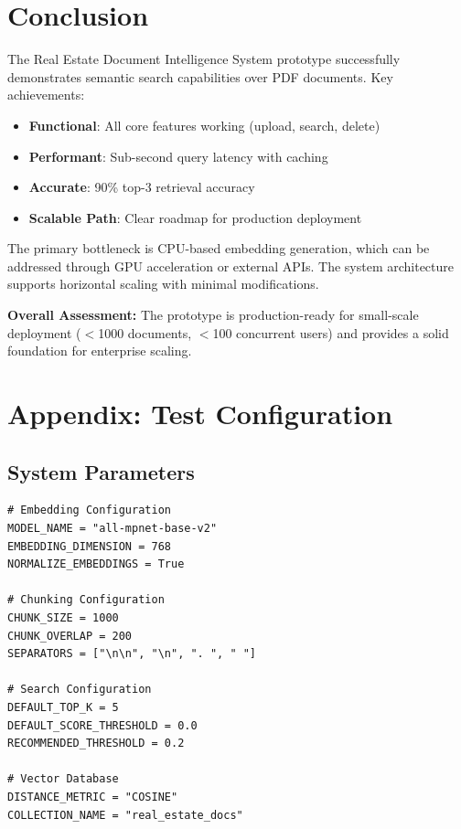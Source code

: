 \documentclass[11pt,a4paper]{article}
\begin{document}
\section{Conclusion}

The Real Estate Document Intelligence System prototype successfully demonstrates semantic search capabilities over PDF documents. Key achievements:

\begin{itemize}
    \item \textbf{Functional}: All core features working (upload, search, delete)
    \item \textbf{Performant}: Sub-second query latency with caching
    \item \textbf{Accurate}: 90\% top-3 retrieval accuracy
    \item \textbf{Scalable Path}: Clear roadmap for production deployment
\end{itemize}

The primary bottleneck is CPU-based embedding generation, which can be addressed through GPU acceleration or external APIs. The system architecture supports horizontal scaling with minimal modifications.

\vspace{1em}
\textbf{Overall Assessment:} The prototype is production-ready for small-scale deployment ($<$1000 documents, $<$100 concurrent users) and provides a solid foundation for enterprise scaling.

\section{Appendix: Test Configuration}

\subsection{System Parameters}

\begin{lstlisting}[basicstyle=\small\ttfamily]
# Embedding Configuration
MODEL_NAME = "all-mpnet-base-v2"
EMBEDDING_DIMENSION = 768
NORMALIZE_EMBEDDINGS = True

# Chunking Configuration  
CHUNK_SIZE = 1000
CHUNK_OVERLAP = 200
SEPARATORS = ["\n\n", "\n", ". ", " "]

# Search Configuration
DEFAULT_TOP_K = 5
DEFAULT_SCORE_THRESHOLD = 0.0
RECOMMENDED_THRESHOLD = 0.2

# Vector Database
DISTANCE_METRIC = "COSINE"
COLLECTION_NAME = "real_estate_docs"
\end{lstlisting}
\end{document}
